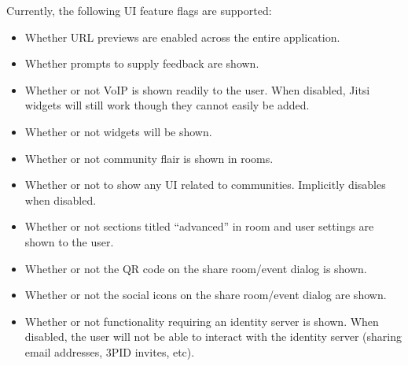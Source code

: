 \documentclass[letterpaper,10pt,openany,oneside,english]{sphinxmanual}
\begin{document}
\sphinxAtStartPar
Currently, the following UI feature flags are supported:
\begin{itemize}
\item {} 
\sphinxAtStartPar
{} \sphinxhyphen{} Whether URL previews are enabled across the entire application.

\item {} 
\sphinxAtStartPar
{} \sphinxhyphen{} Whether prompts to supply feedback are shown.

\item {} 
\sphinxAtStartPar
{} \sphinxhyphen{} Whether or not VoIP is shown readily to the user. When disabled,
Jitsi widgets will still work though they cannot easily be added.

\item {} 
\sphinxAtStartPar
{} \sphinxhyphen{} Whether or not widgets will be shown.

\item {} 
\sphinxAtStartPar
{} \sphinxhyphen{} Whether or not community flair is shown in rooms.

\item {} 
\sphinxAtStartPar
{} \sphinxhyphen{} Whether or not to show any UI related to communities. Implicitly
disables  when disabled.

\item {} 
\sphinxAtStartPar
{} \sphinxhyphen{} Whether or not sections titled “advanced” in room and
user settings are shown to the user.

\item {} 
\sphinxAtStartPar
{} \sphinxhyphen{} Whether or not the QR code on the share room/event dialog
is shown.

\item {} 
\sphinxAtStartPar
{} \sphinxhyphen{} Whether or not the social icons on the share room/event dialog
are shown.

\item {} 
\sphinxAtStartPar
{} \sphinxhyphen{} Whether or not functionality requiring an identity server
is shown. When disabled, the user will not be able to interact with the identity
server (sharing email addresses, 3PID invites, etc).


\end{itemize}
\end{document}
